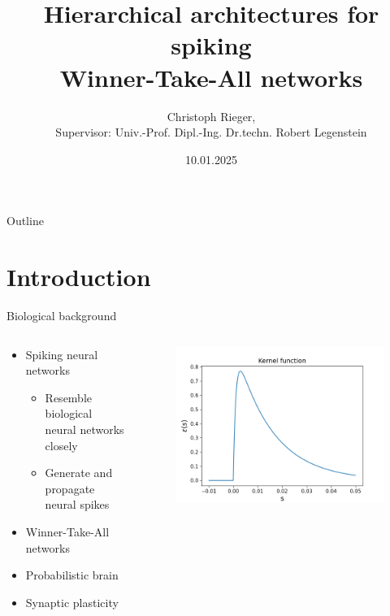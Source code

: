 \documentclass[aspectratio=169]{beamer}
\title[Short Title]{ Hierarchical architectures for spiking \\ Winner-Take-All networks}
\author{Christoph Rieger, \\ Supervisor: Univ.-Prof. Dipl.-Ing. Dr.techn. Robert Legenstein
}
\date{10.01.2025}
\institute{IML}
\begin{document}
\begin{frame}[plain]
  \maketitle
\end{frame}


\begin{frame}{Outline}
  \tableofcontents
\end{frame}


\section{Introduction}

\begin{frame}{Biological background}
  \begin{columns}[onlytextwidth]
	\begin{column}{0.7\textwidth}
	\vspace{-1.0cm}
      \begin{itemize}
        \item Spiking neural networks
        \begin{itemize}
          \item Resemble biological neural networks closely
          \item Generate and propagate neural spikes
        \end{itemize}
        \item Winner-Take-All networks
        \item Probabilistic brain
        \item Synaptic plasticity
      \end{itemize}
	\end{column}
	\begin{column}{0.3\textwidth}
      \begin{figure}
        \includegraphics[width=1\linewidth]{../Latex/figures/kernelFunction.png}
      \end{figure} 
  	\end{column}
  \end{columns}
\end{frame}
\end{document}
